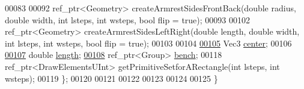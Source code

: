 \begin{DoxyCode}
00083       
00092       ref\_ptr<Geometry> createArmrestSidesFrontBack(\textcolor{keywordtype}{double} radius, \textcolor{keywordtype}{double} width, \textcolor{keywordtype}{int} lsteps, \textcolor{keywordtype}{int} wsteps, \textcolor{keywordtype}{
      bool} flip = \textcolor{keyword}{true});
00093       
00102       ref\_ptr<Geometry> createArmrestSidesLeftRight(\textcolor{keywordtype}{double} length, \textcolor{keywordtype}{double} width, \textcolor{keywordtype}{int} lsteps, \textcolor{keywordtype}{int} wsteps, \textcolor{keywordtype}{
      bool} flip = \textcolor{keyword}{true});
00103 
00104 
\hypertarget{_bench_8h_source_l00105}{}\hyperlink{classbrtr_1_1_bench_a5ea108ad6ee96d487ac00ecacc383aa2}{00105}       Vec3 \hyperlink{classbrtr_1_1_bench_a5ea108ad6ee96d487ac00ecacc383aa2}{center};
00106 
\hypertarget{_bench_8h_source_l00107}{}\hyperlink{classbrtr_1_1_bench_a81188a60871201d741c288396430964d}{00107}       \textcolor{keywordtype}{double} \hyperlink{classbrtr_1_1_bench_a81188a60871201d741c288396430964d}{length};
\hypertarget{_bench_8h_source_l00108}{}\hyperlink{classbrtr_1_1_bench_aa3da8798872d1c2d595c24a48a5cb427}{00108}       ref\_ptr<Group>  \hyperlink{classbrtr_1_1_bench_aa3da8798872d1c2d595c24a48a5cb427}{bench};
00118       ref\_ptr<DrawElementsUInt> getPrimitiveSetforARectangle(\textcolor{keywordtype}{int} lsteps, \textcolor{keywordtype}{int} wsteps);
00119     \};
00120 
00121 
00122 
00123     
00124     
00125 \}
\end{DoxyCode}
